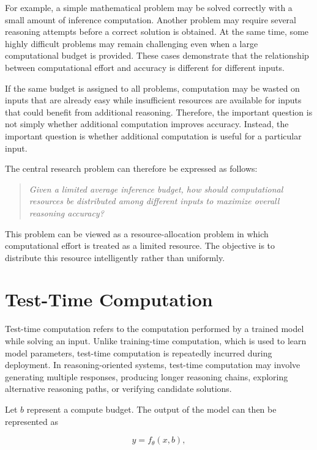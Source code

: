 \documentclass[12pt,a4paper,titlepage]{report}
\begin{document}
For example, a simple mathematical problem may be solved correctly with a small amount of inference computation. Another problem may require several reasoning attempts before a correct solution is obtained. At the same time, some highly difficult problems may remain challenging even when a large computational budget is provided. These cases demonstrate that the relationship between computational effort and accuracy is different for different inputs.

If the same budget is assigned to all problems, computation may be wasted on inputs that are already easy while insufficient resources are available for inputs that could benefit from additional reasoning. Therefore, the important question is not simply whether additional computation improves accuracy. Instead, the important question is whether additional computation is useful for a particular input.

The central research problem can therefore be expressed as follows:

\begin{quote}
\textit{Given a limited average inference budget, how should computational resources be distributed among different inputs to maximize overall reasoning accuracy?}
\end{quote}

This problem can be viewed as a resource-allocation problem in which computational effort is treated as a limited resource. The objective is to distribute this resource intelligently rather than uniformly.

\section{Test-Time Computation}

Test-time computation refers to the computation performed by a trained model while solving an input. Unlike training-time computation, which is used to learn model parameters, test-time computation is repeatedly incurred during deployment. In reasoning-oriented systems, test-time computation may involve generating multiple responses, producing longer reasoning chains, exploring alternative reasoning paths, or verifying candidate solutions.

Let $b$ represent a compute budget. The output of the model can then be represented as

\begin{equation}
y=f_{\theta}(x,b),
\end{equation}
\end{document}
